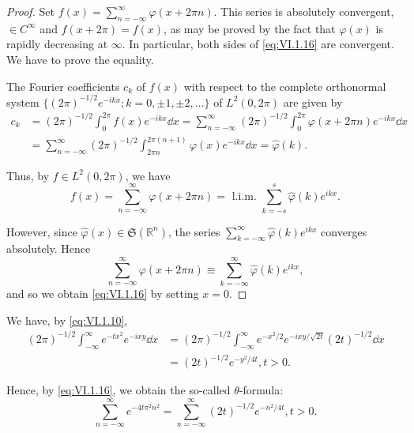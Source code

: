 \begin{proof}
 Set $f(x) = \sum\limits_{n=-\infty}^{\infty} \varphi(x + 2\pi n)$. This series is absolutely convergent, $\in C^\infty$ and $f(x + 2\pi) = f(x)$, as may be proved by the fact that $\varphi(x)$ is rapidly decreasing at $\infty$. In particular, both sides of \eqref{eq:VI.1.16} are convergent. We have to prove the equality. 


The Fourier coefficients $c_k$ of $f(x)$ with respect to the complete orthonormal system $\{(2\pi)^{-1/2} e^{-ikx}; k = 0, \pm 1, \pm 2, \ldots\}$ of $L^2(0, 2\pi)$ are given by 
\[
\begin{aligned}
c _{k} &= (2 \pi) ^{-1/2} \int_{0} ^{2 \pi} f (x) e ^{-ikx} \dd x = \sum\limits_{n = - \infty} ^{\infty} (2 \pi) ^{-1/2} \int_{0} ^{2 \pi} \varphi (x + 2 \pi n) e ^{-ikx} \dd x
\\
&= \sum\limits_{n = - \infty} ^{\infty} (2 \pi) ^{-1/2} \int_{2 \pi n} ^{2 \pi (n +1)} \varphi (x) e ^{-ikx} \dd x = \hat {\varphi} (k).
\end{aligned}
\]

Thus, by $f \in L^2(0, 2\pi)$, we have 
\[
f (x) = \sum\limits_{n = - \infty} ^{\infty} \varphi (x + 2 \pi n) = \text{ l.i.m. } \sum\limits_{k=-s} ^{s} \hat {\varphi} (k) e ^{ikx}.
\]

However, since $\hat{\varphi}(x) \in \mathfrak{S}(\mathbb{R}^{n})$, the series $\sum\limits_{k=-\infty}^{\infty} \hat{\varphi}(k) e^{ikx}$ converges absolutely. Hence 
\[
\sum\limits_{n = - \infty} ^{\infty} \varphi (x + 2 \pi n) \equiv \sum\limits_{k = - \infty} ^{\infty} \hat {\varphi} (k) e ^{ikx},
\]
and so we obtain \eqref{eq:VI.1.16} by setting $x = 0$.
\end{proof}

\begin{examplen} We have, by \eqref{eq:VI.1.10},
\[
\begin{aligned} (2 \pi) ^{-1/2} \int_{- \infty} ^{\infty} e ^ {- t x ^{2}} e ^{-ixy} \dd x & = (2 \pi) ^{-1/2} \int_{- \infty} ^{\infty} e ^ {- x ^{2} / 2} e ^ {- i x y / \sqrt {2 t}} (2 t) ^{-1/2} \dd x \\ & = (2 t) ^{-1/2} e ^ {- y ^{2} / 4 t}, t > 0. \end{aligned}
\]

Hence, by \eqref{eq:VI.1.16}, we obtain the so-called $\theta$-formula: 
\begin{equation}\label{eq:VI.1.17}
\sum\limits_{n = - \infty} ^{\infty} e ^ {- 4 t \pi^{2} n ^{2}} = \sum\limits_{n = - \infty} ^{\infty} (2 t) ^{-1/2} e ^ {- n ^{2} / 4 t}, t > 0.
\end{equation}


\end{examplen}
\label{sec:VI.2}

